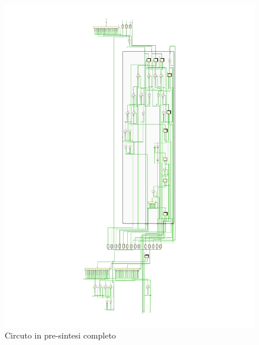 \documentclass[12pt]{article} %
\begin{document}
			\begin{figure}[H]
				\centering
				\includegraphics[width=1.1\textwidth]{RTL_Opened_Schematic.pdf}
				\caption{Circuto in pre-sintesi completo}
				\label{fig:Schematic_RTL_Opened}
			\end{figure}
\end{document}

